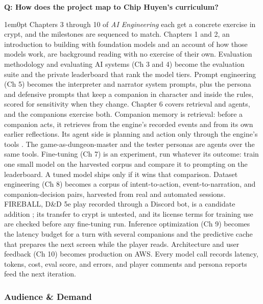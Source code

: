\documentclass[11pt,letterpaper]{article}
\newcounter{faqnum}
\newenvironment{faqpair}[1]{%
  \needspace{4\baselineskip}\vspace{0.5em}\refstepcounter{faqnum}%
  \noindent\textbf{\color{SectionBlue}Q\thefaqnum: #1}\par\nopagebreak[4]%
  \vspace{0.2em}\begin{adjustwidth}{1em}{0pt}\setlength{\parindent}{0pt}%
}{\end{adjustwidth}\vspace{0.5em}}
\begin{document}
\begin{faqpair}{How does the project map to Chip Huyen's curriculum?}\label{faq:curriculum}
Chapters 3 through 10 of \textit{AI Engineering} \cite{huyen2025aie} each
get a concrete exercise in crypt, and the milestones are sequenced to
match. Chapters 1 and 2, an introduction to building with foundation
models and an account of how those models work, are background reading
with no exercise of their own. Evaluation methodology
and evaluating AI systems (Ch 3 and 4) become the evaluation suite and the
private leaderboard that rank the model tiers. Prompt engineering (Ch 5)
becomes the interpreter and narrator system prompts, plus the persona and
defensive prompts that keep a companion in character and inside the rules,
scored for sensitivity when they change. Chapter 6 covers retrieval and
agents, and the companions exercise both. Companion memory is retrieval:
before a companion acts, it retrieves from the engine's recorded events
and from its own earlier reflections. Its agent side is planning and
action only through the engine's tools \cite{park2023generativeagents}.
The game-as-dungeon-master and the tester personas are agents over the
same tools. Fine-tuning (Ch 7) is an experiment, run whatever its outcome:
train one small model on the harvested corpus and compare it to prompting
on the leaderboard. A tuned model ships only if it wins that comparison.
Dataset engineering (Ch 8) becomes a corpus of intent-to-action,
event-to-narration, and companion-decision pairs, harvested from real and
automated sessions. FIREBALL, D\&D 5e play recorded through a Discord bot,
is a candidate addition \cite{zhu2023fireball}; its transfer to crypt is
untested, and its license terms for training use are checked before any
fine-tuning run. Inference
optimization (Ch 9) becomes the latency budget for a turn with several
companions and the predictive cache that prepares the next screen while
the player reads. Architecture and user feedback (Ch 10) becomes production
on AWS. Every model call records latency, tokens, cost, eval score, and
errors, and player comments and persona reports feed the next iteration.
\end{faqpair}

\subsubsection*{Audience \& Demand}
\end{document}
